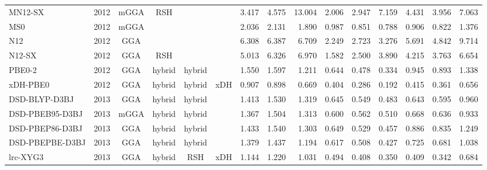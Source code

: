 \begin{landscape}
\begin{longtable}{ll:cccc:rrr:rrr:rrr}
    MN12-SX          & 2012 & mGGA & RSH      &             &           & 3.417             & 4.575             & 13.004 & 2.006              & 2.947             & 7.159  & 4.431   & 3.956 & 7.063 \\
    MS0              & 2012 & mGGA &          &             &           & 2.036             & 2.131             & 1.890  & 0.987              & 0.851             & 0.788  & 0.906   & 0.822 & 1.376 \\
    N12              & 2012 & GGA  &          &             &           & 6.308             & 6.387             & 6.709  & 2.249              & 2.723             & 3.276  & 5.691   & 4.842 & 9.714 \\
    N12-SX           & 2012 & GGA  & RSH      &             &           & 5.013             & 6.326             & 6.970  & 1.582              & 2.500             & 3.890  & 4.215   & 3.763 & 6.654 \\
    PBE0-2           & 2012 & GGA  & hybrid   & hybrid      &           & 1.550             & 1.597             & 1.211  & 0.644              & 0.478             & 0.334  & 0.945   & 0.893 & 1.338 \\
    xDH-PBE0         & 2012 & GGA  & hybrid   & hybrid      & xDH       & 0.907             & 0.898             & 0.669  & 0.404              & 0.286             & 0.192  & 0.415   & 0.361 & 0.656 \\
    DSD-BLYP-D3BJ    & 2013 & GGA  & hybrid   & hybrid      &           & 1.413             & 1.530             & 1.319  & 0.645              & 0.549             & 0.483  & 0.643   & 0.595 & 0.960 \\
    DSD-PBEB95-D3BJ  & 2013 & mGGA & hybrid   & hybrid      &           & 1.367             & 1.504             & 1.313  & 0.600              & 0.562             & 0.510  & 0.668   & 0.636 & 0.933 \\
    DSD-PBEP86-D3BJ  & 2013 & GGA  & hybrid   & hybrid      &           & 1.433             & 1.540             & 1.303  & 0.649              & 0.529             & 0.457  & 0.886   & 0.835 & 1.249 \\
    DSD-PBEPBE-D3BJ  & 2013 & GGA  & hybrid   & hybrid      &           & 1.379             & 1.437             & 1.194  & 0.617              & 0.508             & 0.427  & 0.725   & 0.681 & 1.038 \\
    lrc-XYG3         & 2013 & GGA  & hybrid   & RSH         & xDH       & 1.144             & 1.220             & 1.031  & 0.494              & 0.408             & 0.350  & 0.409   & 0.342 & 0.684 \\

\end{longtable}
\end{landscape}
